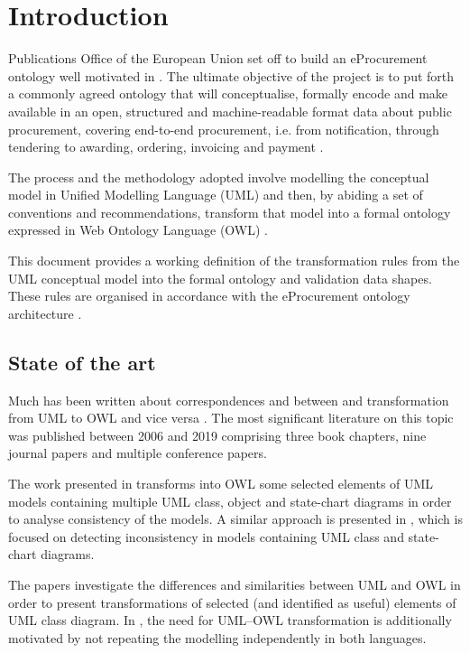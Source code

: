 \section{Introduction}
\label{sec:introduction}

	Publications Office of the European Union set off to build an eProcurement ontology well motivated in \citep[p.5-9]{costetchi2020a}. The ultimate objective of the project is to put forth a commonly agreed ontology that will conceptualise, formally encode and make available in an open, structured and machine-readable format data about public procurement, covering end-to-end procurement, i.e. from notification, through tendering to awarding, ordering, invoicing and payment \citep{d4.07-2016}.
	
	The process and the methodology adopted involve modelling the conceptual model in Unified Modelling Language (UML) \citep{uml2.5} and then, by abiding a set of conventions and recommendations, transform that model into a formal ontology \citep[p.12-21]{costetchi2020a} expressed in Web Ontology Language (OWL) \citep{owl2}. 
	
	This document provides a working definition of the transformation rules from the UML conceptual model into the formal ontology and validation data shapes. These rules are organised in accordance with the eProcurement ontology architecture \citep[p.21-27]{costetchi2020a}.
	
	 \subsection{State of the art}
	 Much has been written about correspondences and between and transformation from UML to OWL and vice versa \citep{sadowska2019}. The most significant literature on this topic was published between 2006 and 2019 comprising three book chapters, nine journal papers and multiple conference papers. 
	 
	 The work presented in \citep{khan2015consistency} transforms into
 OWL some selected elements of UML models
containing multiple UML class, object and state-chart diagrams in order to analyse consistency of the models. A similar approach is presented in
\citep{khan2013consistency}, which is focused on detecting inconsistency
in models containing UML class and state-chart
diagrams.
	 
	 The papers \citep{hajjamy2016,zedlitz2012,zedlitz2014conceptual} investigate the differences and similarities between UML and OWL
in order to present transformations of selected
	(and identified as useful) elements of UML class
 diagram. In \citep{zedlitz2014conceptual}, the need for UML--OWL transformation is additionally motivated by not repeating the modelling independently in both languages.
	 
